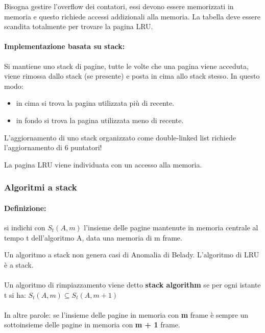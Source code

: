 Bisogna gestire l'overflow dei contatori, essi devono essere memorizzati in memoria e questo richiede accessi addizionali alla memoria.
La tabella deve essere scandita totalmente per trovare la
pagina LRU.


\paragraph{Implementazione basata su stack:}
Si mantiene uno stack di pagine, tutte le volte che una pagina viene acceduta, viene rimossa dallo stack (se presente) e posta in cima allo stack stesso.
In questo modo:
\begin{itemize}
    \item in cima si trova la pagina utilizzata più di recente.
    \item in fondo si trova la pagina utilizzata meno di recente.
\end{itemize}

L'aggiornamento di uno stack organizzato come double-linked list richiede l'aggiornamento di 6 puntatori!

La pagina LRU viene individuata con un accesso alla memoria.


\newpage
\subsubsection{Algoritmi a stack}

\paragraph{Definizione:} si indichi con $S_t(A,m)$ l'insieme delle pagine mantenute in memoria centrale al tempo t dell'algoritmo A, data una memoria di m frame.

Un algoritmo a stack non genera casi di Anomalia di Belady. L'algoritmo di LRU è a stack.

\paragraph{}
Un algoritmo di rimpiazzamento viene detto \textbf{stack algorithm} se per ogni istante t si ha: 
\newline
$S_t(A,m) \subseteq S_t(A,m+1)$
\newline
\paragraph{}
In altre parole: se l'insieme delle pagine in memoria con \textbf{m} frame è sempre un sottoinsieme delle pagine in memoria con \textbf{m + 1} frame.

